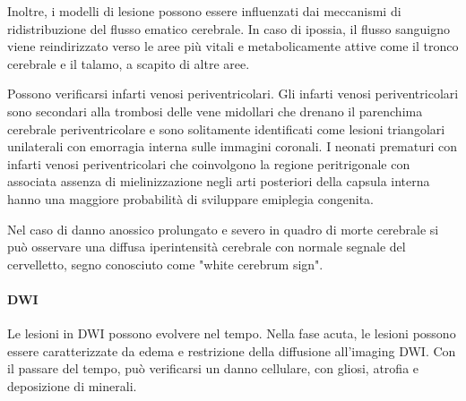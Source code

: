 Inoltre, i modelli di lesione possono essere influenzati dai meccanismi di ridistribuzione del flusso ematico cerebrale. In caso di ipossia, il flusso sanguigno viene reindirizzato verso le aree più vitali e metabolicamente attive come il tronco cerebrale e il talamo, a scapito di altre aree.

Possono verificarsi infarti venosi periventricolari. Gli infarti venosi periventricolari sono secondari alla trombosi delle vene midollari che drenano il parenchima cerebrale periventricolare e sono solitamente identificati come lesioni triangolari unilaterali con emorragia interna sulle immagini coronali. I neonati prematuri con infarti venosi periventricolari che coinvolgono la regione peritrigonale con associata assenza di mielinizzazione negli arti posteriori della capsula interna hanno una maggiore probabilità di sviluppare emiplegia congenita.

Nel caso di danno anossico prolungato e severo in quadro di morte cerebrale si può osservare una diffusa iperintensità cerebrale con normale segnale del cervelletto, segno conosciuto come "white cerebrum sign".

\paragraph{DWI} Le lesioni in DWI possono evolvere nel tempo. Nella fase acuta, le lesioni possono essere caratterizzate da edema e restrizione della diffusione all'imaging DWI. Con il passare del tempo, può verificarsi un danno cellulare, con gliosi, atrofia e deposizione di minerali.

